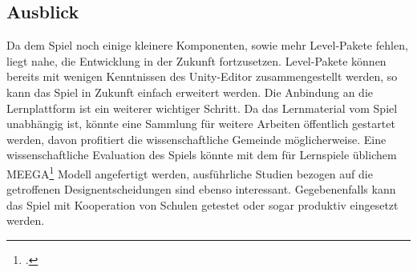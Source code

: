 \subsection{Ausblick}
	Da dem Spiel noch einige kleinere Komponenten, sowie mehr Level-Pakete fehlen, liegt nahe, die Entwicklung in der Zukunft fortzusetzen. Level-Pakete können bereits mit wenigen Kenntnissen des Unity-Editor zusammengestellt werden, so kann das Spiel in Zukunft einfach erweitert werden. Die Anbindung an die Lernplattform ist ein weiterer wichtiger Schritt.
	Da das Lernmaterial vom Spiel unabhängig ist, könnte eine Sammlung für weitere Arbeiten öffentlich gestartet werden, davon profitiert die wissenschaftliche Gemeinde möglicherweise.
	Eine wissenschaftliche Evaluation des Spiels könnte mit dem für Lernspiele üblichem MEEGA\footcite{psych1} Modell angefertigt werden, ausführliche Studien bezogen auf die getroffenen Designentscheidungen sind ebenso interessant.
	Gegebenenfalls kann das Spiel mit Kooperation von Schulen getestet oder sogar produktiv eingesetzt werden.
